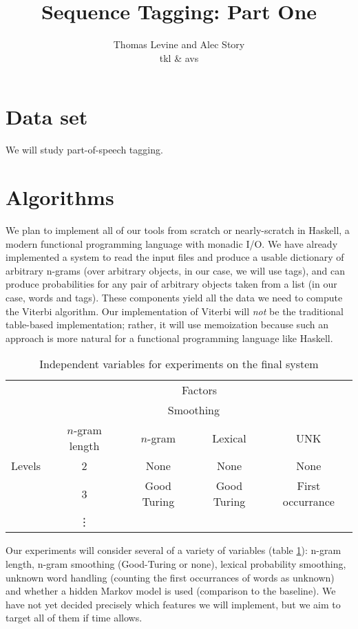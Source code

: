 \documentclass{article}
\title{Sequence Tagging: Part One}
\author{Thomas Levine and Alec Story\\\small{tkl\osn{22} \& avs\osn{38}}}
\begin{document}
\maketitle
\section{Data set}
We will study part-of-speech tagging.
\section{Algorithms}

We plan to implement all of our tools from scratch or nearly-scratch in Haskell,
a modern functional programming language with monadic I/O.  We have already
implemented a system to read the input files and produce a usable dictionary of
arbitrary n-grams (over arbitrary objects, in our case, we will use tags), and
can produce probabilities for any pair of arbitrary objects taken from a list
(in our case, words and tags).  These components yield all the data we need to
compute the Viterbi algorithm.  Our implementation of Viterbi will \emph{not} be
the traditional table-based implementation; rather, it will use memoization
because such an approach is more natural for a functional programming language
like Haskell.

\begin{table}
\begin{tabular}{lcccc}
\toprule
& \multicolumn{4}{c}{Factors} \\
\cmidrule{2-5}
& & \multicolumn{2}{c}{Smoothing} \\
\cmidrule{3-4}
       & $n$-gram length & $n$-gram & Lexical & UNK\\
\cmidrule{2-5}
Levels &  2  & None        & None        & None \\
       &  3  & Good Turing & Good Turing & First occurrance  \\
       &  \vdots  &             &             &      \\
\bottomrule
\end{tabular}
\caption{\label{tab:ind_vars}Independent variables for experiments on the final system}
\end{table}

Our experiments will consider several of a variety of variables (table \ref{tab:ind_vars}): n-gram length,
n-gram smoothing (Good-Turing or none), lexical probability smoothing, unknown
word handling (counting the first occurrances of words as unknown) and
whether a hidden Markov model is used (comparison to the baseline).
We have not yet decided precisely which features we will implement, but we
aim to target all of them if time allows.
\end{document}
